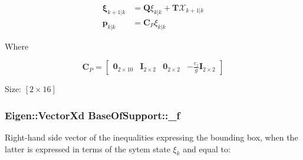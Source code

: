 \begin{align*} \mathbf{\xi}_{k+1|k} &= \mathbf{Q} \xi_{k|k} + \mathbf{T}\mathcal{X}_{k+1|k} \\ \mathbf{p}_{k|k} & =\mathbf{C}_P \xi_{k|k} \end{align*}

\-Where

\[ \mathbf{C}_P = \left[ \begin{array}{ccccc} \mathbf{0}_{2\times10} & \mathbf{I}_{2\times2} & \mathbf{0}_{2\times2} & -\frac{c_z}{g}\mathbf{I}_{2\times2} \end{array}\right] \]

\-Size\-: $[2\times16]$ \hypertarget{classBaseOfSupport_aa2d0af7272d153ead5e088ff67c981e8}{
\subsubsection[{\-\_\-f}]{\setlength{\rightskip}{0pt plus 5cm}\-Eigen\-::\-Vector\-Xd {\bf \-Base\-Of\-Support\-::\-\_\-f}}}\label{classBaseOfSupport_aa2d0af7272d153ead5e088ff67c981e8}
\-Right-\/hand side vector of the inequalities expressing the bounding box, when the latter is expressed in terms of the sytem state $\xi_k$ and equal to\-:


